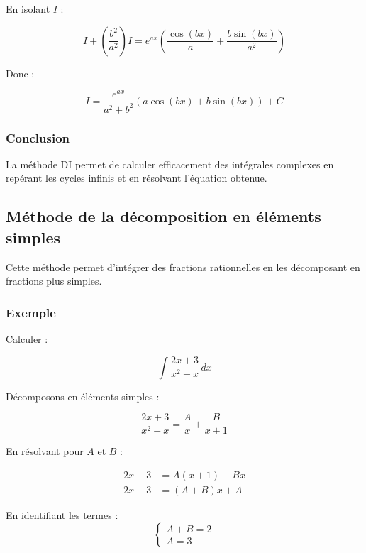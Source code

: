 En isolant $I$ :

\begin{equation*}
    I + \left( \dfrac{b^2}{a^2} \right) I = e^{ax} \left( \dfrac{\cos(bx)}{a} + \dfrac{b \sin(bx)}{a^2} \right)
\end{equation*}

Donc :

\begin{equation*}
    I = \dfrac{e^{ax}}{a^2 + b^2} \left( a \cos(bx) + b \sin(bx) \right) + C
\end{equation*}

\subsubsection*{Conclusion}

La méthode DI permet de calculer efficacement des intégrales complexes en repérant les cycles infinis et en résolvant l'équation obtenue.

\subsection{Méthode de la décomposition en éléments simples}

Cette méthode permet d'intégrer des fractions rationnelles en les décomposant en fractions plus simples.

\subsubsection*{Exemple}

Calculer :

\begin{equation}
    \int \frac{2x + 3}{x^2 + x} \, dx
\end{equation}

Décomposons en éléments simples :

\begin{equation}
    \frac{2x + 3}{x^2 + x} = \frac{A}{x} + \frac{B}{x + 1}
\end{equation}

En résolvant pour $A$ et $B$ :

\begin{align*}
    2x + 3 &= A(x + 1) + B x \\
    2x + 3 &= (A + B) x + A
\end{align*}

En identifiant les termes :
\begin{equation*}
    \begin{cases}
        A + B = 2 \\
        A = 3
    \end{cases}
\end{equation*}

